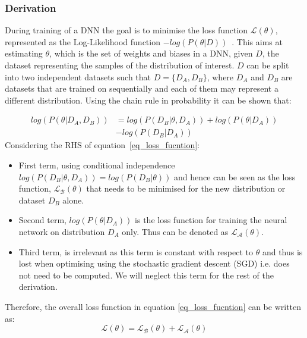 \subsubsection{Derivation}

%
During training of a DNN the goal is to minimise the loss function $\mathcal{L}(\theta)$, represented as the Log-Likelihood function $-log(P(\theta|D))$~\cite{GoodBengCour2016}.
%
This aims at estimating $\theta$, which is the set of weights and biases in a DNN, given $D$, the dataset representing the samples of the distribution of interest.
%
$D$ can be split into two independent datasets such that $D=\{D_A,D_B\}$, where $D_A$ and $D_B$ are datasets that are trained on sequentially and each of them may represent a different distribution. 
%
Using the chain rule in probability it can be shown that: 

\begin{equation}\label{eq_loss_fucntion}
\begin{split}
log(P(\theta|D_A,D_B))&=log(P(D_B|\theta,D_A))+log(P(\theta|D_A)) 
\\
& - log(P(D_B|D_A))
\end{split}
\end{equation}
Considering the RHS of equation~\ref{eq_loss_fucntion}:
\begin{itemize}
    \item First term, using conditional independence $log(P(D_B|\theta,D_A)) = log(P(D_B|\theta))$ and hence can be seen as the loss function, $\mathcal{L_B}(\theta)$ that needs to be minimised for the new distribution or dataset $D_B$ alone.
%
    \item Second term, $log(P(\theta|D_A))$ is the loss function for training the neural network on distribution $D_A$ only. Thus can be denoted as $\mathcal{L_A}(\theta)$. 
%
    \item  Third term, is irrelevant as this term is constant with respect to $\theta$ and thus is lost when optimising using the stochastic gradient descent (SGD) i.e. does not need to be computed. We will neglect this term for the rest of the derivation.
\end{itemize}
%
Therefore, the overall loss function in equation \ref{eq_loss_fucntion} can be written as:
%
\begin{equation}\label{eq_loss_fucntion_short}
\mathcal{L}(\theta)=\mathcal{L_B}(\theta)+\mathcal{L_A}(\theta)
\end{equation}

